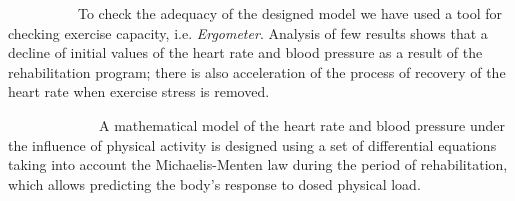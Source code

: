 \par ~~~~~~~~~~To check the adequacy of the designed model we have used a tool for checking exercise capacity, i.e. \textit{Ergometer}. Analysis of few results shows that a decline of initial values of the heart rate and blood pressure as a result of the rehabilitation program; there is also acceleration of the process of recovery of the heart rate when exercise stress is removed.

\par ~~~~~~~~~~~~~A mathematical model of the heart rate and blood pressure
under the influence of physical activity is designed using a set of differential equations taking into account the Michaelis-Menten law during the period of rehabilitation, which allows predicting the body’s response to dosed physical load.